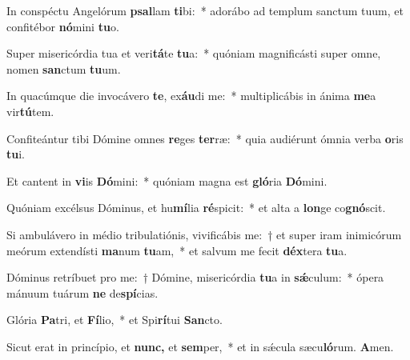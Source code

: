 \item In conspéctu Angelórum \textbf{psal}lam \textbf{ti}bi:~* adorábo ad templum sanctum tuum, et confitébor \textbf{nó}mini \textbf{tu}o.
\item Super misericórdia tua et veri\textbf{tá}te \textbf{tu}a:~* quóniam magnificásti super omne, nomen \textbf{san}ctum \textbf{tu}um.
\item In quacúmque die invocávero \textbf{te}, ex\textbf{áu}di me:~* multiplicábis in ánima \textbf{me}a vir\textbf{tú}tem.
\item Confiteántur tibi Dómine omnes \textbf{re}ges \textbf{ter}ræ:~* quia audiérunt ó\-mnia verba \textbf{o}ris \textbf{tu}i.
\item Et cantent in \textbf{vi}is \textbf{Dó}mini:~* quóniam magna est \textbf{gló}ria \textbf{Dó}mini.
\item Quóniam excélsus Dóminus, et hu\textbf{mí}lia \textbf{ré}spicit:~* et alta a \textbf{lon}ge co\textbf{gnó}scit.
\item Si ambulávero in médio tribulatiónis, vivificábis me:~† et super iram inimicórum meórum extendísti \textbf{ma}num \textbf{tu}am,~* et salvum me fecit \textbf{déx}tera \textbf{tu}a.
\item Dóminus retríbuet pro me:~† Dómine, misericórdia \textbf{tu}a in \textbf{sǽ}culum:~* ópera mánuum tuárum \textbf{ne} de\textbf{spí}cias.
\item Glória \textbf{Pa}tri, et \textbf{Fí}lio,~* et Spi\textbf{rí}tui \textbf{San}cto.
\item Sicut erat in princípio, et \textbf{nunc,} et \textbf{sem}per,~* et in sǽcula sæcu\textbf{ló}rum. \textbf{A}men.
